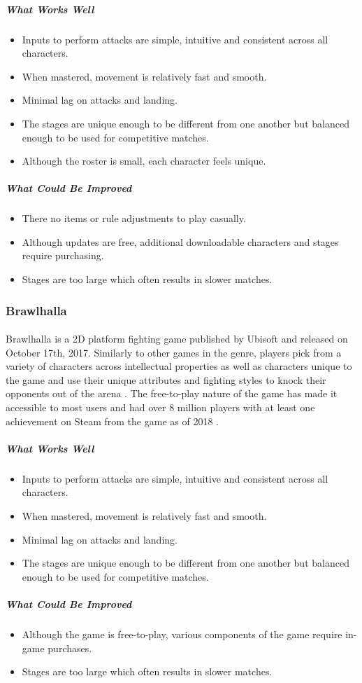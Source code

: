 \subparagraph{What Works Well}

\begin{itemize}
    \item Inputs to perform attacks are simple, intuitive and consistent across all characters.
    \item When mastered, movement is relatively fast and smooth.
    \item Minimal lag on attacks and landing.
    \item The stages are unique enough to be different from one another but balanced enough to be used for competitive matches.
    \item Although the roster is small, each character feels unique.
\end{itemize}

\subparagraph{What Could Be Improved}

\begin{itemize}
    \item There no items or rule adjustments to play casually.
    \item Although updates are free, additional downloadable characters and stages require purchasing.
    \item Stages are too large which often results in slower matches.
\end{itemize}

\subsubsection{Brawlhalla}

\paragraph{} Brawlhalla is a 2D platform fighting game published by Ubisoft and released on October 17th, 2017. Similarly to other games in the genre, players pick from a variety of characters across intellectual properties as well as characters unique to the game and use their unique attributes and fighting styles to knock their opponents out of the arena \autocite{blue_mammoth_games_brawlhalla_2017}. The free-to-play nature of the game has made it accessible to most users and had over 8 million players with at least one achievement on Steam from the game as of 2018 \autocite{orland_valve_2018}.

\subparagraph{What Works Well}

\begin{itemize}
    \item Inputs to perform attacks are simple, intuitive and consistent across all characters.
    \item When mastered, movement is relatively fast and smooth.
    \item Minimal lag on attacks and landing.
    \item The stages are unique enough to be different from one another but balanced enough to be used for competitive matches.
\end{itemize}

\subparagraph{What Could Be Improved}

\begin{itemize}
    \item Although the game is free-to-play, various components of the game require in-game purchases.
    \item Stages are too large which often results in slower matches.
\end{itemize}